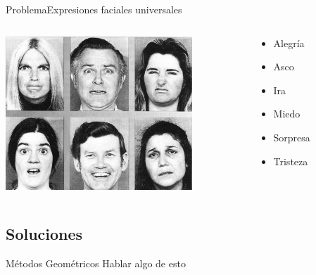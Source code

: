 \documentclass{beamer}
\begin{document}
    \begin{frame}{Problema}{Expresiones faciales universales}
		  \begin{columns}[onlytextwidth]
    		  	\begin{column}{0.7\textwidth}
      			\centering
      			\includegraphics[width=7cm]{imagenes/expresiones_faciales_universales.jpg}
    			\end{column}
    		    \begin{column}{0.3\textwidth}
        	      \begin{itemize}
            	    \item Alegría
            		\item Asco
            		\item Ira
            		\item Miedo
            		\item Sorpresa
            		\item Tristeza
        	   	  \end{itemize}
            \end{column}
          \end{columns}          
          
          
          
    \end{frame}
    

    \subsection{Soluciones}
        \begin{frame}{Métodos Geométricos}
              \centering
                Hablar algo de esto
        \end{frame}
    
\end{document}
